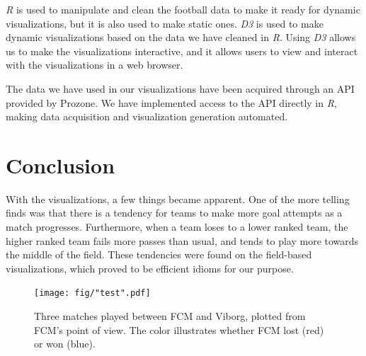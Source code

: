 \documentclass[portrait, a0,30pt]{sciposter}
\begin{document}
\begin{multicols}{2}
\begin{mdframed}
\hspace{30pt}\emph{R} is used to manipulate and clean the football data to make it ready for dynamic visualizations, but it is also used to make static ones. \emph{D3} is used to make dynamic visualizations based on the data we have cleaned in \emph{R}.
Using \emph{D3} allows us to make the visualizations interactive, and it allows users to view and interact with the visualizations in a web browser.

\hspace{30pt}The data we have used in our visualizations have been acquired through an API provided by Prozone. We have implemented access to the API directly in \emph{R}, making data acquisition and visualization generation automated.

\end{mdframed}

\section*{Conclusion}
\begin{mdframed}
With the visualizations, a few things became apparent. One of the more telling finds was that there is a tendency for teams to make more goal attempts as a match progresses. Furthermore, when a team loses to a lower ranked team, the higher ranked team fails more passes than usual, and tends to play more towards the middle of the field.
These tendencies were found on the field-based visualizations, which proved to be efficient idioms for our purpose.
\end{mdframed}

\begin{mdframed}
\begin{figure}
	\center
	\texttt{[image: fig/"test".pdf]}
	\label{Fig:viz}
	\caption{Three matches played between FCM and Viborg, plotted from FCM's point of view. The color illustrates whether FCM lost (red) or won (blue).}
\end{figure}
\end{mdframed}


\end{multicols}
\end{document}
